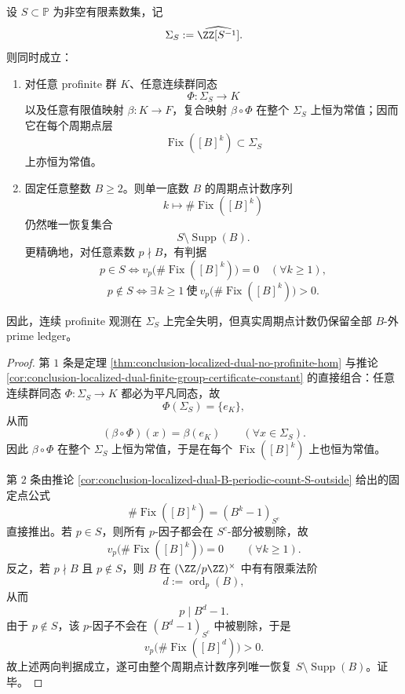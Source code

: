 \begin{theorem}\label{thm:conclusion-solenoid-profinite-blindness-fixedpoint-ledger}
设 \(S\subset \mathbb P\) 为非空有限素数集，记
\[
\Sigma_S:=\widehat{\ZZ[S^{-1}]}.
\]
则同时成立：
\begin{enumerate}
  \item 对任意 profinite 群 \(K\)、任意连续群同态
  \[
  \Phi:\Sigma_S\to K
  \]
  以及任意有限值映射 \(\beta:K\to F\)，复合映射 \(\beta\circ\Phi\) 在整个 \(\Sigma_S\) 上恒为常值；因而它在每个周期点层
  \[
  \operatorname{Fix}([B]^k)\subset \Sigma_S
  \]
  上亦恒为常值。
  \item 固定任意整数 \(B\ge 2\)。则单一底数 \(B\) 的周期点计数序列
  \[
  k\longmapsto \#\operatorname{Fix}([B]^k)
  \]
  仍然唯一恢复集合
  \[
  S\setminus \operatorname{Supp}(B).
  \]
  更精确地，对任意素数 \(p\nmid B\)，有判据
  \[
  p\in S
  \iff
  v_p\!\bigl(\#\operatorname{Fix}([B]^k)\bigr)=0
  \quad(\forall k\ge 1),
  \]
  \[
  p\notin S
  \iff
  \exists\,k\ge 1\ \text{使}\ v_p\!\bigl(\#\operatorname{Fix}([B]^k)\bigr)>0.
  \]
\end{enumerate}
因此，连续 profinite 观测在 \(\Sigma_S\) 上完全失明，但真实周期点计数仍保留全部 \(B\)-外 prime ledger。
\end{theorem}
\begin{proof}
第 \(1\) 条是定理 \ref{thm:conclusion-localized-dual-no-profinite-hom} 与推论 \ref{cor:conclusion-localized-dual-finite-group-certificate-constant} 的直接组合：任意连续群同态 \(\Phi:\Sigma_S\to K\) 都必为平凡同态，故
\[
\Phi(\Sigma_S)=\{e_K\},
\]
从而
\[
(\beta\circ\Phi)(x)=\beta(e_K)
\qquad(\forall x\in \Sigma_S).
\]
因此 \(\beta\circ\Phi\) 在整个 \(\Sigma_S\) 上恒为常值，于是在每个 \(\operatorname{Fix}([B]^k)\) 上也恒为常值。

第 \(2\) 条由推论 \ref{cor:conclusion-localized-dual-B-periodic-count-S-outside} 给出的固定点公式
\[
\#\operatorname{Fix}([B]^k)=(B^k-1)_{S^c}
\]
直接推出。若 \(p\in S\)，则所有 \(p\)-因子都会在 \(S^c\)-部分被剔除，故
\[
v_p\!\bigl(\#\operatorname{Fix}([B]^k)\bigr)=0
\qquad(\forall k\ge 1).
\]
反之，若 \(p\nmid B\) 且 \(p\notin S\)，则 \(B\) 在 \((\ZZ/p\ZZ)^\times\) 中有有限乘法阶
\[
d:=\operatorname{ord}_p(B),
\]
从而
\[
p\mid B^d-1.
\]
由于 \(p\notin S\)，该 \(p\)-因子不会在 \((B^d-1)_{S^c}\) 中被剔除，于是
\[
v_p\!\bigl(\#\operatorname{Fix}([B]^d)\bigr)>0.
\]
故上述两向判据成立，遂可由整个周期点计数序列唯一恢复 \(S\setminus \operatorname{Supp}(B)\)。证毕。
\end{proof}
